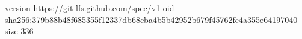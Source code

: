 version https://git-lfs.github.com/spec/v1
oid sha256:379b88b48f685355f12337db68cba4b5b42952b679f45762fe4a355e64197040
size 336
